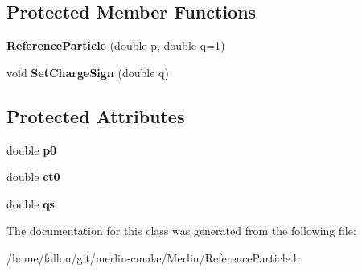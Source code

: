 \subsection*{Protected Member Functions}
\begin{DoxyCompactItemize}
\item 
\mbox{\label{classReferenceParticle_a12711501e1394b2a8da22ae17fe77fcf}} 
{\bfseries Reference\+Particle} (double p, double q=1)
\item 
\mbox{\label{classReferenceParticle_a229212d143de8b0b3e6b3a4372a6ae8a}} 
void {\bfseries Set\+Charge\+Sign} (double q)
\end{DoxyCompactItemize}
\subsection*{Protected Attributes}
\begin{DoxyCompactItemize}
\item 
\mbox{\label{classReferenceParticle_aae4d7611535c6781a042037b6766f8a4}} 
double {\bfseries p0}
\item 
\mbox{\label{classReferenceParticle_a941f126e579b170708d8043317e3e271}} 
double {\bfseries ct0}
\item 
\mbox{\label{classReferenceParticle_a3123a1ccdf8950b30fa9ba53155b727b}} 
double {\bfseries qs}
\end{DoxyCompactItemize}


The documentation for this class was generated from the following file\+:\begin{DoxyCompactItemize}
\item 
/home/fallon/git/merlin-\/cmake/\+Merlin/Reference\+Particle.\+h\end{DoxyCompactItemize}
